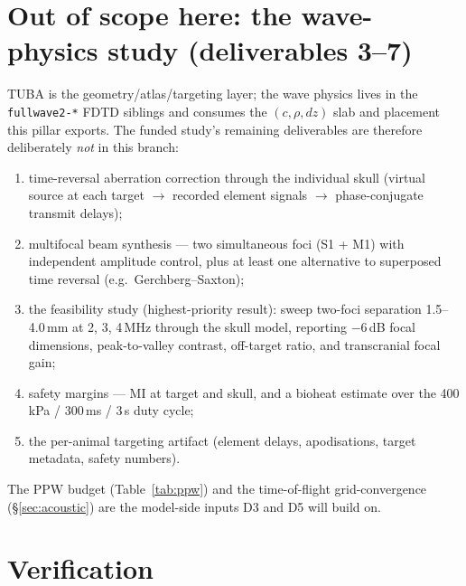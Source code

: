 \documentclass{compactarticle}
\begin{document}
\section{Out of scope here: the wave-physics study (deliverables 3--7)}
\label{sec:scope-out}

TUBA is the geometry/atlas/targeting layer; the wave physics lives in
the \texttt{fullwave2-*} FDTD siblings and consumes the
$(c,\rho,dz)$ slab and placement this pillar exports. The funded
study's remaining deliverables are therefore deliberately \emph{not}
in this branch:
\begin{enumerate}[leftmargin=*]
\setlength\itemsep{0pt}
  \item[D3] time-reversal aberration correction through the individual
        skull (virtual source at each target $\to$ recorded element
        signals $\to$ phase-conjugate transmit delays);
  \item[D4] multifocal beam synthesis --- two simultaneous foci (S1 +
        M1) with independent amplitude control, plus at least one
        alternative to superposed time reversal
        (e.g.\ Gerchberg--Saxton);
  \item[D5] the feasibility study (highest-priority result): sweep
        two-foci separation 1.5--4.0\,mm at 2, 3, 4\,MHz through the
        skull model, reporting $-6$\,dB focal dimensions,
        peak-to-valley contrast, off-target ratio, and transcranial
        focal gain;
  \item[D6] safety margins --- MI at target and skull, and a bioheat
        estimate over the 400\,kPa / 300\,ms / 3\,s duty cycle;
  \item[D7] the per-animal targeting artifact (element delays,
        apodisations, target metadata, safety numbers).
\end{enumerate}
The PPW budget (Table~\ref{tab:ppw}) and the time-of-flight
grid-convergence (\S\ref{sec:acoustic}) are the model-side inputs D3
and D5 will build on.

\section{Verification}
\label{sec:tests}
\end{document}
